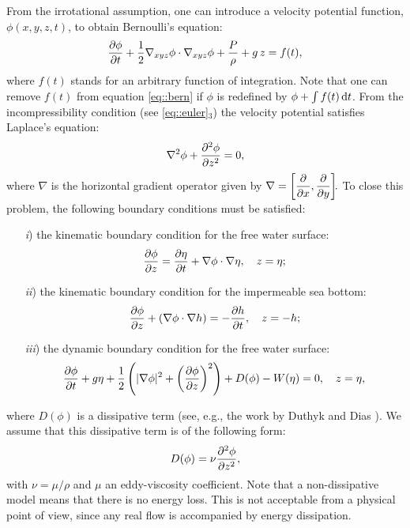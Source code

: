 From the irrotational assumption, one can  introduce a
velocity potential function, \(\phi(x,y,z,t)\), to obtain  Bernoulli's equation:
\begin{equation}\label{eq::bern}
\frac{\partial  \phi}{\partial  t}+\frac{1}{2}\nabla_{xyz} \phi \cdot\nabla_{xyz} \phi
+\frac{P}{\rho} +g\, z=f(t), 
\end{equation}
where \(f(t)\) stands
for  an arbitrary function of integration.
 Note that one can   remove
 \(f(t)\)  from equation \eqref{eq::bern} if  \(\phi\) is
 redefined by \(\phi+\int f(t)\, {\rm d}t\).
From the incompressibility condition
(see \eqref{eq::euler}\(_3\))    
 the velocity potential  satisfies  Laplace's equation:
\begin{equation}
\nabla^2\phi+\frac{\partial ^2\phi}{\partial z^2}=0,
\end{equation}
where \(\nabla\) is the  horizontal gradient operator given
by \(\displaystyle \nabla=\left[\frac{\partial }{\partial x},\frac{\partial }{\partial y}\right]\!\!.\) 
To close this problem,  the following boundary conditions
must be satisfied:
\begin{enumerate}
\item[{\it i})]  the kinematic boundary condition for the free water surface: 
\begin{equation}
\frac{\partial \phi}{\partial z}=\frac{\partial \eta}{\partial t}+\nabla\phi\cdot\nabla\eta,\quad z=\eta;
\end{equation} 
\item[{\it ii})] the kinematic boundary condition for the impermeable sea bottom:
\begin{equation}
\frac{\partial \phi}{\partial z}+(\nabla\phi\cdot\nabla h)=-\frac{\partial h}{\partial t},
\quad z=-h ;
\end{equation}
\item[{\it iii})] the dynamic boundary condition for the free
water surface:
\begin{equation}\label{eq::dyn}
\frac{\partial \phi}{\partial t}+ g\eta+\frac{1}{2}
\left(|\nabla\phi|^2 +\left(\frac{\partial \phi}{\partial z}\right)^2\right)+
D(\phi)-W(\eta) = 0,
\quad z =\eta,
\end{equation}
\end{enumerate}
where \(D(\phi)\) is a  dissipative term 
(see, e.g., the work by Duthyk and 
Dias \cite{DutDia07}). 
We assume that this dissipative term
 is of the following form:
\begin{equation}
 D(\phi)=\nu\frac{\partial ^2\phi}{\partial z^2},
\end{equation}
with  \(\nu=\mu/\rho\)  and \(\mu\) an eddy-viscosity coefficient. Note that a
non-dissipative model means that there is no energy loss.
This is not acceptable from a physical point of view, since
any real flow is accompanied by energy dissipation.


